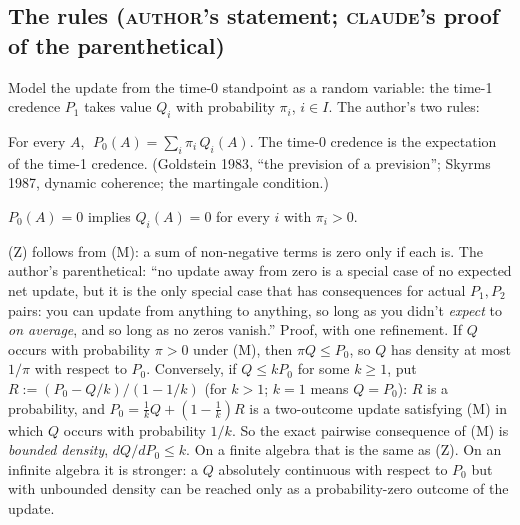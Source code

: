 \documentclass[11pt,a4paper]{article}
\newcommand{\AUTHOR}{\textnormal{\scshape author}}
\newcommand{\CLAUDE}{\textnormal{\scshape claude}}
\begin{document}
\subsection{The rules (\AUTHOR's statement; \CLAUDE's proof of the parenthetical)}
Model the update from the time-0 standpoint as a random variable: the time-1 credence $P_1$ takes value $Q_i$ with probability $\pi_i$, $i \in I$. The author's two rules:

\begin{description}[leftmargin=2.2em,style=nextline]
\item[(M) No expected net update.] For every $A$, $\;P_0(A) = \sum_i \pi_i\,Q_i(A)$. The time-0 credence is the expectation of the time-1 credence. (Goldstein 1983, ``the prevision of a prevision''; Skyrms 1987, dynamic coherence; the martingale condition.)
\item[(Z) No update away from zero.] $P_0(A) = 0$ implies $Q_i(A) = 0$ for every $i$ with $\pi_i > 0$.
\end{description}
(Z) follows from (M): a sum of non-negative terms is zero only if each is. The author's parenthetical: ``no update away from zero is a special case of no expected net update, but it is the only special case that has consequences for actual $P_1, P_2$ pairs: you can update from anything to anything, so long as you didn't \emph{expect} to \emph{on average}, and so long as no zeros vanish.'' Proof, with one refinement. If $Q$ occurs with probability $\pi > 0$ under (M), then $\pi Q \le P_0$, so $Q$ has density at most $1/\pi$ with respect to $P_0$. Conversely, if $Q \le k P_0$ for some $k \ge 1$, put $R := (P_0 - Q/k)/(1 - 1/k)$ (for $k > 1$; $k = 1$ means $Q = P_0$): $R$ is a probability, and $P_0 = \tfrac1k Q + (1 - \tfrac1k) R$ is a two-outcome update satisfying (M) in which $Q$ occurs with probability $1/k$. So the exact pairwise consequence of (M) is \emph{bounded density}, $dQ/dP_0 \le k$. On a finite algebra that is the same as (Z). On an infinite algebra it is stronger: a $Q$ absolutely continuous with respect to $P_0$ but with unbounded density can be reached only as a probability-zero outcome of the update.
\end{document}
